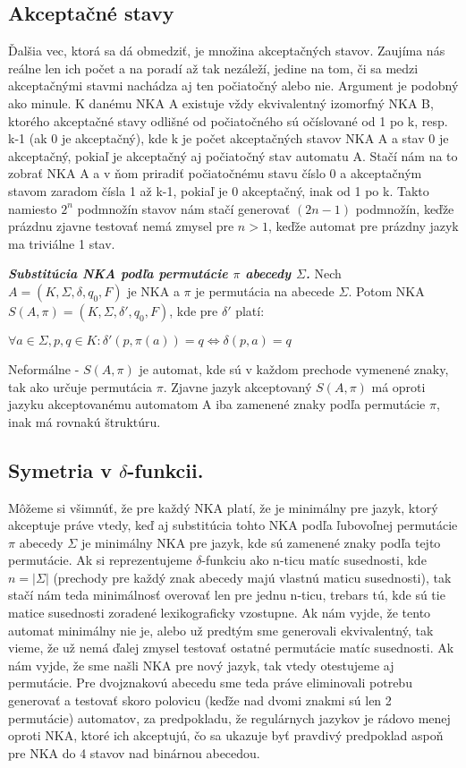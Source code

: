 \subsection {Akceptačné stavy} Ďalšia vec, ktorá sa dá obmedziť, je množina akceptačných stavov. Zaujíma nás reálne len ich počet a na poradí až tak nezáleží, jedine na tom, či sa medzi akceptačnými stavmi nachádza aj ten počiatočný alebo nie. Argument je podobný ako minule. K danému NKA A existuje vždy ekvivalentný izomorfný NKA B, ktorého akceptačné stavy odlišné od počiatočného sú očíslované od 1 po k, resp. k-1 (ak 0 je akceptačný), kde k je počet akceptačných stavov NKA A a stav 0 je akceptačný, pokiaľ je akceptačný aj počiatočný stav automatu A. Stačí nám na to zobrať NKA A a v ňom priradiť počiatočnému stavu číslo 0 a akceptačným stavom zaradom čísla 1 až k-1, pokiaľ je 0 akceptačný, inak od 1 po k. Takto namiesto $2^n$ podmnožín stavov nám stačí generovať $(2n - 1)$ podmnožín, keďže prázdnu zjavne testovať nemá zmysel pre $n>1$, keďže automat pre prázdny jazyk ma triviálne 1 stav.


\begin{defn}{\textbf {\textit {Substitúcia NKA podľa permutácie $\pi$ abecedy $\Sigma$.}}} Nech $A = (K,\Sigma,\delta,q_0,F)$ je NKA a $\pi$ je permutácia na abecede $\Sigma$. Potom NKA $S(A,\pi)=(K,\Sigma,\delta',q_0,F)$, kde pre $\delta'$ platí:
\\
\centerline{$\forall a\in \Sigma, p,q \in K: \delta'(p,\pi(a)) = q \Longleftrightarrow \delta(p,a) = q$}
\end{defn}
Neformálne - $S(A,\pi)$ je  automat, kde sú v každom prechode vymenené znaky, tak ako určuje permutácia $\pi$. Zjavne jazyk akceptovaný $S(A,\pi)$ má oproti jazyku akceptovanému automatom A iba zamenené znaky podľa permutácie $\pi$, inak má rovnakú štruktúru.


\subsection{Symetria v $\delta$-funkcii.} Môžeme si všimnúť, že pre každý NKA platí, že je minimálny pre jazyk, ktorý akceptuje práve vtedy, keď aj substitúcia tohto NKA podľa ľubovoľnej permutácie $\pi$ abecedy $\Sigma$ je minimálny NKA pre jazyk, kde sú zamenené znaky podľa tejto permutácie. Ak si reprezentujeme $\delta$-funkciu ako n-ticu matíc susednosti, kde $n=|\Sigma|$ (prechody pre každý znak abecedy majú vlastnú maticu susednosti), tak stačí nám teda minimálnosť overovať len pre jednu n-ticu, trebars tú, kde sú tie matice susednosti zoradené lexikograficky vzostupne. Ak nám vyjde, že tento automat minimálny nie je, alebo už predtým sme generovali ekvivalentný, tak vieme, že už nemá ďalej zmysel testovať ostatné permutácie matíc susednosti. Ak nám vyjde, že sme našli NKA pre nový jazyk, tak vtedy otestujeme aj permutácie. Pre dvojznakovú abecedu sme teda práve eliminovali potrebu generovať a testovať skoro polovicu (keďže nad dvomi znakmi sú len 2 permutácie) automatov, za predpokladu, že regulárnych jazykov je rádovo menej oproti NKA, ktoré ich akceptujú, čo sa ukazuje byť pravdivý predpoklad aspoň pre NKA do 4 stavov nad binárnou abecedou.    


